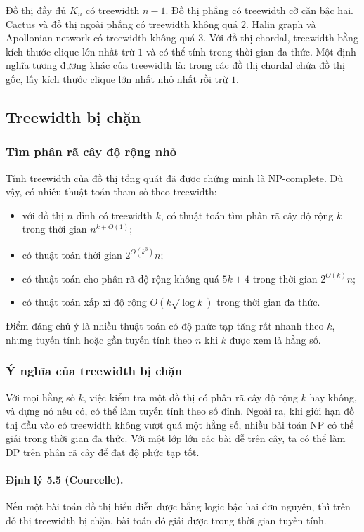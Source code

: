 \documentclass[11pt]{article}
\begin{document}
Đồ thị đầy đủ $K_n$ có treewidth $n-1$. Đồ thị phẳng có treewidth cỡ căn bậc
hai. Cactus và đồ thị ngoài phẳng có treewidth không quá $2$. Halin graph và
Apollonian network có treewidth không quá $3$. Với đồ thị chordal, treewidth
bằng kích thước clique lớn nhất trừ $1$ và có thể tính trong thời gian đa thức.
Một định nghĩa tương đương khác của treewidth là: trong các đồ thị chordal chứa
đồ thị gốc, lấy kích thước clique lớn nhất nhỏ nhất rồi trừ $1$.

\subsection{Treewidth bị chặn}

\subsubsection{Tìm phân rã cây độ rộng nhỏ}

Tính treewidth của đồ thị tổng quát đã được chứng minh là NP-complete. Dù vậy,
có nhiều thuật toán tham số theo treewidth:
\begin{itemize}
  \item với đồ thị $n$ đỉnh có treewidth $k$, có thuật toán tìm phân rã cây độ
  rộng $k$ trong thời gian $n^{k+O(1)}$;
  \item có thuật toán thời gian $2^{\tilde O(k^3)}n$;
  \item có thuật toán cho phân rã độ rộng không quá $5k+4$ trong thời gian
  $2^{O(k)}n$;
  \item có thuật toán xấp xỉ độ rộng $O(k\sqrt{\log k})$ trong thời gian đa
  thức.
\end{itemize}
Điểm đáng chú ý là nhiều thuật toán có độ phức tạp tăng rất nhanh theo $k$,
nhưng tuyến tính hoặc gần tuyến tính theo $n$ khi $k$ được xem là hằng số.

\subsubsection{Ý nghĩa của treewidth bị chặn}

Với mọi hằng số $k$, việc kiểm tra một đồ thị có phân rã cây độ rộng $k$ hay
không, và dựng nó nếu có, có thể làm tuyến tính theo số đỉnh. Ngoài ra, khi
giới hạn đồ thị đầu vào có treewidth không vượt quá một hằng số, nhiều bài toán
NP có thể giải trong thời gian đa thức. Với một lớp lớn các bài dễ trên cây, ta
có thể làm DP trên phân rã cây để đạt độ phức tạp tốt.

\paragraph{Định lý 5.5 (Courcelle).}
Nếu một bài toán đồ thị biểu diễn được bằng logic bậc hai đơn nguyên, thì trên
đồ thị treewidth bị chặn, bài toán đó giải được trong thời gian tuyến tính.
\end{document}
